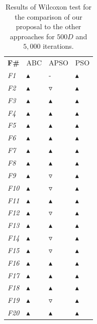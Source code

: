 \begin{table}[!h]
\caption{\small{Results of Wilcoxon test for the comparison of our proposal to the other approaches for $500D$ and $5,000$ iterations.}}
\label{tab:Wilcoxon_500D}
\begin{center}
\begin{tabular}{p{0.5cm}|p{1.5cm}|p{1.5cm}|p{1.5cm}}
\hline\noalign{\smallskip}
\textbf{F\#} & ABC & APSO & PSO    \\		
\noalign{\smallskip}
\hline
\noalign{\smallskip}
\textit{F1}	& $\blacktriangle$  & -  & $\blacktriangle$ \\
\textit{F2}	& $\blacktriangle$  & $\triangledown$  & $\blacktriangle$\\
\textit{F3}	& $\blacktriangle$  & $\blacktriangle$  & $\blacktriangle$  \\
\textit{F4} & $\blacktriangle$  & $\blacktriangle$  & $\blacktriangle$  \\
\textit{F5} & $\blacktriangle$  & $\blacktriangle$  & $\blacktriangle$  \\
\textit{F6} & $\blacktriangle$  & $\blacktriangle$  & $\blacktriangle$ \\
\textit{F7} & $\blacktriangle$  & $\blacktriangle$  & $\blacktriangle$  \\
\textit{F8} & $\blacktriangle$  & $\blacktriangle$  & $\blacktriangle$  \\
\textit{F9} & $\blacktriangle$  & $\triangledown$  & $\blacktriangle$ \\
\textit{F10}& $\blacktriangle$  & $\triangledown$  & $\blacktriangle$ \\
\textit{F11}& $\blacktriangle$  & $\blacktriangle$  & $\blacktriangle$ \\
\textit{F12}& $\blacktriangle$  & $\triangledown$  & $\blacktriangle$  \\
\textit{F13}& $\blacktriangle$  & $\blacktriangle$  & $\blacktriangle$   \\
\textit{F14}& $\blacktriangle$  & $\triangledown$  & $\blacktriangle$   \\
\textit{F15}& $\blacktriangle$  & $\triangledown$  & $\blacktriangle$   \\
\textit{F16}& $\blacktriangle$  & $\blacktriangle$  & $\blacktriangle$  \\
\textit{F17}& $\blacktriangle$  & $\blacktriangle$  & $\blacktriangle$  \\
\textit{F18}& $\blacktriangle$  & $\blacktriangle$  & $\blacktriangle$ \\
\textit{F19}& $\blacktriangle$  & $\triangledown$  & $\blacktriangle$ \\
\textit{F20}& $\blacktriangle$  & $\blacktriangle$  & $\blacktriangle$ \\
\hline
\end{tabular}
\end{center}
\end{table}

